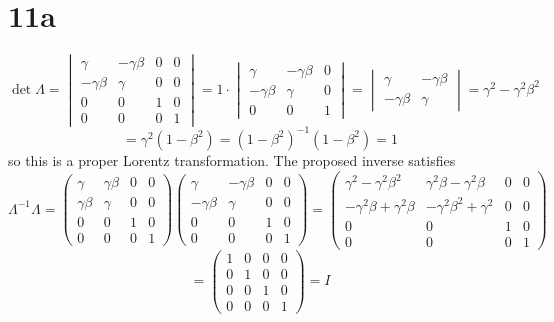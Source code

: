 \documentclass{article}
\begin{document}
\section*{11a}
\[
  \det \Lambda =
  \begin{vmatrix}
    \gamma & -\gamma\beta & 0 & 0 \\
    -\gamma\beta & \gamma & 0 & 0 \\
    0 & 0 & 1 & 0 \\
    0 & 0 & 0 & 1
  \end{vmatrix}
  =
  1\cdot
  \begin{vmatrix}
    \gamma & -\gamma\beta & 0 \\
    -\gamma\beta & \gamma & 0 \\
    0 & 0 & 1
  \end{vmatrix}
  =
  \begin{vmatrix}
    \gamma & -\gamma\beta \\
    -\gamma\beta & \gamma
  \end{vmatrix}
  =\gamma^{2}-\gamma^{2}\beta^{2}
\]
\[
  =\gamma^{2}(1-\beta^{2})=(1-\beta^{2})^{-1}(1-\beta^{2})=1
\]
so this is a proper Lorentz transformation.
The proposed inverse satisfies
\[
  \Lambda^{-1}\Lambda=
  \begin{pmatrix}
    \gamma & \gamma\beta & 0 & 0 \\
    \gamma\beta & \gamma & 0 & 0 \\
    0 & 0 & 1 & 0 \\
    0 & 0 & 0 & 1
  \end{pmatrix}
  \begin{pmatrix}
    \gamma & -\gamma\beta & 0 & 0 \\
    -\gamma\beta & \gamma & 0 & 0 \\
    0 & 0 & 1 & 0 \\
    0 & 0 & 0 & 1
  \end{pmatrix}
  =
  \begin{pmatrix}
    \gamma^{2}-\gamma^{2}\beta^{2} & \gamma^{2}\beta-\gamma^{2}\beta & 0 & 0 \\
    -\gamma^{2}\beta+\gamma^{2}\beta & -\gamma^{2}\beta^{2}+\gamma^{2} & 0 & 0 \\
    0 & 0 & 1 & 0 \\
    0 & 0 & 0 & 1
  \end{pmatrix}
\]
\[
  =
  \begin{pmatrix}
    1 & 0 & 0 & 0 \\
    0 & 1 & 0 & 0 \\
    0 & 0 & 1 & 0 \\
    0 & 0 & 0 & 1
  \end{pmatrix}
  =I
\]
\end{document}
